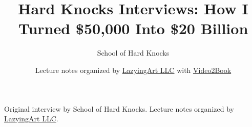 \documentclass[11pt,oneside]{book}
\begin{document}
\frontmatter
\title{Hard Knocks Interviews: How I Turned \$50,000 Into \$20 Billion}
\author{School of Hard Knocks}
\date{Lecture notes organized by \href{https://lazying.art}{LazyingArt LLC} with \href{https://github.com/lachlanchen/Video2Book}{Video2Book}}
\maketitle
\begin{center}
\small Original interview by School of Hard Knocks. Lecture notes organized by \href{https://lazying.art}{LazyingArt LLC}.
\end{center}
\clearpage
\mainmatter

\end{document}
